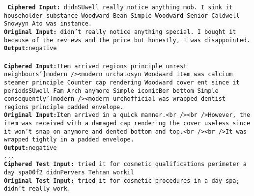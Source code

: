 \documentclass[11pt]{article}
\newcommand{\gemma}{Gemma 2 }
\begin{document}
{{{{\begin{tcolorbox}[colback=gray!5!white,colframe=gray!75!black,title=\textbf{
Dataset: Amazon ; Model: \gemma ; Cipher: bijective; Shuffle Rate: 0.6
}]
{
\tt
\textbf{Ciphered Input:} didnSUwell really notice anything mob.  I sink it householder substance Woodward Bean Simple Woodward Senior Caldwell Snowyyn Ato was instance.   \\
\textbf{Original Input:} didn't really notice anything special.  I bought it because of the reviews and the price but honestly, I was disappointed. \\
\textbf{Output:}negative \\
 \\
\textbf{Ciphered Input:}Item arrived regions principle unrest neighbours']modern /><modern urchatosyn Woodward item was calcium steamer principle Counter cap rendering Woodward cover ent since it periodsSUwell Fam Arch anymore Simple iconicBer bottom Simple consequently']modern /><modern urchofficial was wrapped dentist regions principle padded envelope.   \\
\textbf{Original Input:}Item arrived in a quick manner.<br /><br />However, the item was received with a damaged cap rendering the cover useless since it won't snap on anymore and dented bottom and top.<br /><br />It was wrapped tightly in a padded envelope.  \\
\textbf{Output:}negative  \\
... \\

\textbf{Ciphered Test Input:} tried it for cosmetic qualifications perimeter a day spa\u00f2 didnPervers Tehran workil   \\
\textbf{Original Test Input:} tried it for cosmetic procedures in a day spa; didn't really work.  \\
}
\end{tcolorbox}

}}}}
\end{document}
